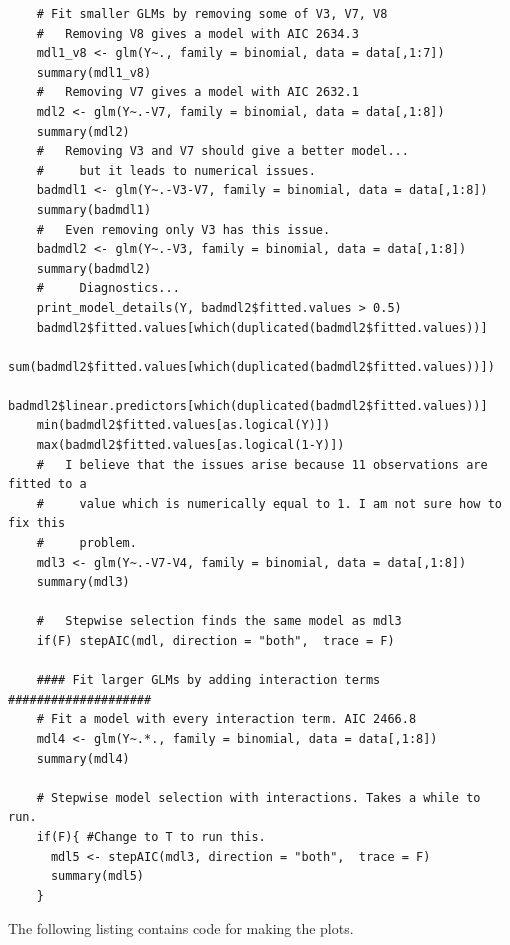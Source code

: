 \documentclass[11pt, oneside]{article}
\begin{document}
\begin{lstlisting}
    # Fit smaller GLMs by removing some of V3, V7, V8 
    #   Removing V8 gives a model with AIC 2634.3
    mdl1_v8 <- glm(Y~., family = binomial, data = data[,1:7])
    summary(mdl1_v8)
    #   Removing V7 gives a model with AIC 2632.1
    mdl2 <- glm(Y~.-V7, family = binomial, data = data[,1:8])
    summary(mdl2)
    #   Removing V3 and V7 should give a better model...
    #     but it leads to numerical issues. 
    badmdl1 <- glm(Y~.-V3-V7, family = binomial, data = data[,1:8])
    summary(badmdl1)
    #   Even removing only V3 has this issue. 
    badmdl2 <- glm(Y~.-V3, family = binomial, data = data[,1:8])
    summary(badmdl2)
    #     Diagnostics... 
    print_model_details(Y, badmdl2$fitted.values > 0.5)
    badmdl2$fitted.values[which(duplicated(badmdl2$fitted.values))]
    sum(badmdl2$fitted.values[which(duplicated(badmdl2$fitted.values))])
    badmdl2$linear.predictors[which(duplicated(badmdl2$fitted.values))]
    min(badmdl2$fitted.values[as.logical(Y)])
    max(badmdl2$fitted.values[as.logical(1-Y)])
    #   I believe that the issues arise because 11 observations are fitted to a
    #     value which is numerically equal to 1. I am not sure how to fix this
    #     problem.
    mdl3 <- glm(Y~.-V7-V4, family = binomial, data = data[,1:8])
    summary(mdl3)
    
    #   Stepwise selection finds the same model as mdl3
    if(F) stepAIC(mdl, direction = "both",  trace = F)
    
    #### Fit larger GLMs by adding interaction terms ####################
    # Fit a model with every interaction term. AIC 2466.8
    mdl4 <- glm(Y~.*., family = binomial, data = data[,1:8])
    summary(mdl4)
    
    # Stepwise model selection with interactions. Takes a while to run.
    if(F){ #Change to T to run this. 
      mdl5 <- stepAIC(mdl3, direction = "both",  trace = F)
      summary(mdl5)
    }
\end{lstlisting}
\normalsize
The following listing contains code for making the plots. 
\footnotesize
\end{document}
